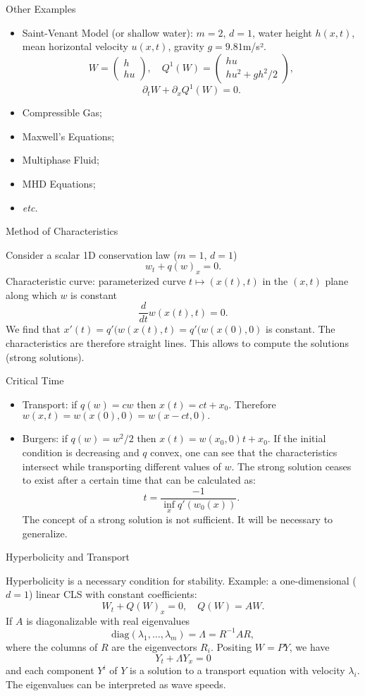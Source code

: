 \documentclass[english]{beamer}
\begin{document}
%
\begin{frame}{Other Examples}
\begin{itemize}
\item Saint-Venant Model (or shallow water): $m=2$, $d=1$, water height $h(x,t)$, mean horizontal  velocity $u(x,t)$, gravity $g=9.81$m/s².
$$
W=\left(\begin{array}{c}
  h\\
  hu
  \end{array}\right),\quad Q^{1}(W)=\left(\begin{array}{c}
  hu\\
  hu^{2}+gh^{2}/2
  \end{array}\right),
$$
$$
\partial_{t}W+\partial_{x}Q^1(W)=0.
$$
\item Compressible Gas;
\item Maxwell's Equations;
\item Multiphase Fluid;
\item MHD Equations;
\item \textsl{etc.}
\end{itemize}
\end{frame}
%
\begin{frame}{Method of Characteristics}

Consider a scalar 1D conservation law ($m=1$, $d=1$)
\[
w_{t}+q(w)_{x}=0.
\]
Characteristic curve: parameterized curve $t	\mapsto(x(t),t)$ in the $(x,t)$ plane along which $w$ is constant
\[
\frac{d}{dt}w(x(t),t)=0.
\]
We find that $x'(t)=q'(w(x(t),t)=q'(w(x(0),0)$ is constant. The characteristics are therefore straight lines. This allows to compute the solutions (strong solutions).
\end{frame}
\begin{frame}{Critical Time}
\begin{itemize}
\item Transport: if $q(w)=cw$ then $x(t)=ct+x_{0}.$ Therefore $w(x,t)=w(x(0),0)=w(x-ct,0).$
\item Burgers: if $q(w)=w^{2}/2$ then $x(t)=w(x_{0},0)t+x_{0}$. If the initial condition is decreasing and $q$ convex, one can see that the characteristics intersect while transporting different values of $w$. The strong solution ceases to exist after a certain time that can be calculated as:
\[
t=\frac{-1}{\inf_{x}q'(w_{0}(x))}.
\]
The concept of a strong solution is not sufficient. It will be necessary to generalize.
\end{itemize}
\end{frame}
%
\begin{frame}{Hyperbolicity and Transport}

Hyperbolicity is a necessary condition for stability. Example: a one-dimensional ($d=1$) linear CLS with constant coefficients:
\[
W_{t}+Q(W)_{x}=0,\quad Q(W)=AW.
\]
If $A$ is diagonalizable with real eigenvalues
\[
\text{diag}(\lambda_{1},\ldots,\lambda_{m})=\Lambda=R^{-1}AR,
\]
where the columns of $R$ are the eigenvectors $R_{i}$. Positing $W=PY$, we have
\[
Y_{t}+\Lambda Y_{x}=0
\]
and each component $Y^{i}$ of $Y$ is a solution to a transport equation with velocity $\lambda_{i}$. The eigenvalues can be interpreted as wave speeds.
\end{frame}
\end{document}
